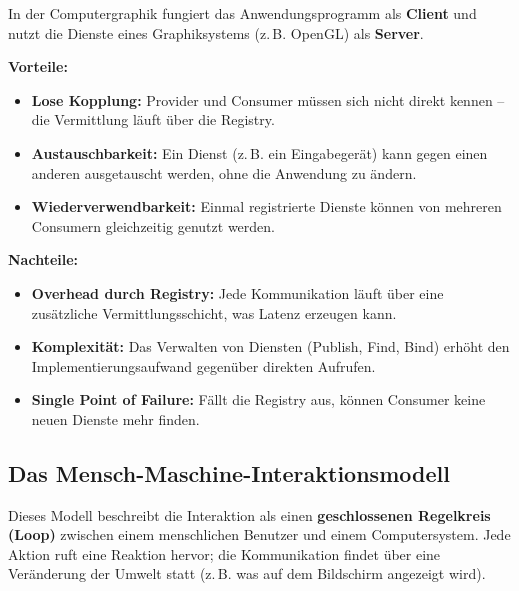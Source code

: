 \documentclass[12pt, a4paper]{article}
\begin{document}
\begin{examplebox}
  In der Computergraphik fungiert das Anwendungsprogramm als \textbf{Client} und
  nutzt die Dienste eines Graphiksystems (z.\,B. OpenGL) als \textbf{Server}.
\end{examplebox}

\textbf{Vorteile:}
\begin{itemize}
  \item \textbf{Lose Kopplung:} Provider und Consumer müssen sich nicht direkt
        kennen -- die Vermittlung läuft über die Registry.
  \item \textbf{Austauschbarkeit:} Ein Dienst (z.\,B. ein Eingabegerät) kann
        gegen einen anderen ausgetauscht werden, ohne die Anwendung zu ändern.
  \item \textbf{Wiederverwendbarkeit:} Einmal registrierte Dienste können von
        mehreren Consumern gleichzeitig genutzt werden.
\end{itemize}

\textbf{Nachteile:}
\begin{itemize}
  \item \textbf{Overhead durch Registry:} Jede Kommunikation läuft über eine
        zusätzliche Vermittlungsschicht, was Latenz erzeugen kann.
  \item \textbf{Komplexität:} Das Verwalten von Diensten (Publish, Find, Bind)
        erhöht den Implementierungsaufwand gegenüber direkten Aufrufen.
  \item \textbf{Single Point of Failure:} Fällt die Registry aus, können
        Consumer keine neuen Dienste mehr finden.
\end{itemize}

\subsection{Das Mensch-Maschine-Interaktionsmodell}

Dieses Modell beschreibt die Interaktion als einen \textbf{geschlossenen Regelkreis (Loop)}
zwischen einem menschlichen Benutzer und einem Computersystem. Jede Aktion ruft eine
Reaktion hervor; die Kommunikation findet über eine Veränderung der \glqq{}Umwelt\grqq{} statt
(z.\,B. was auf dem Bildschirm angezeigt wird).
\end{document}
